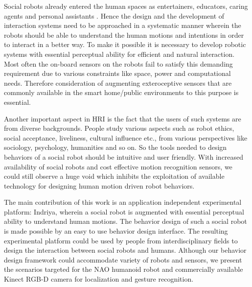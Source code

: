 \documentclass{llncs}
\begin{document}
	Social robots already entered the human spaces as entertainers, educators, caring agents and personal assistants \cite{Aldebaran}. Hence the design and the development of interaction systems need to be approached in a systematic manner wherein the robots should be able to understand the human motions and intentions in order to interact in a better way. To make it possible it is necessary to develop robotic systems with essential perceptual ability for efficient and natural interaction. Most often the on-board sensors on the robots fail to satisfy this demanding requirement due to various constraints like space, power and computational needs. Therefore consideration of augmenting exteroceptive sensors that are commonly available in the smart home/public environments to this purpose is essential.

	Another important aspect in HRI is the fact that the users of such systems are from diverse backgrounds. People study various aspects such as robot ethics, social acceptance, liveliness, cultural influence etc., from various perspectives like sociology, psychology, humanities and so on. So the tools needed to design behaviors of a social robot should be intuitive and user friendly.  With increased availability of social robots and cost effective motion recognition sensors, we could still observe a huge void which inhibits the exploitation of available technology for designing human motion driven robot behaviors.

	The main contribution of this work is an application independent experimental platform: Indriya, wherein a social robot is augmented with essential perceptual ability to understand human motions. The behavior design of such a social robot is made possible by an easy to use behavior design interface. The resulting experimental platform could be used by people from interdisciplinary fields to design the interaction between social robots and humans. Although our behavior design framework could accommodate variety of robots and sensors, we present the scenarios targeted for the NAO \cite{NaoRobot} humanoid robot and commercially available Kinect \cite{Kinect2014} RGB-D camera for localization and gesture recognition. 
\end{document}
